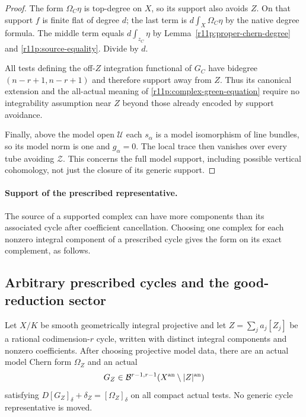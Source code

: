 \begin{proof}
The form $\Omega_C\eta$ is top-degree on $X$, so its support also
avoids $Z$.  On that support $f$ is finite flat of degree $d$;
the last term is $d\int_X\Omega_C\eta$ by the native degree formula.
The middle term equals $d\int_{z_C}\eta$ by
Lemma~\ref{r11p:proper-chern-degree} and
\eqref{r11p:source-equality}.  Divide by $d$.

All tests defining the off-$Z$ integration functional of $G_C$
have bidegree $(n-r+1,n-r+1)$ and therefore support away from $Z$.
Thus its canonical extension and the all-actual meaning of
\eqref{r11p:complex-green-equation} require no integrability
assumption near $Z$ beyond those already encoded by support avoidance.

Finally, above the model open $\mathcal U$ each $s_\alpha$ is a model
isomorphism of line bundles, so its model norm is one and $g_\alpha=0$.
The local trace then vanishes over every tube avoiding $\mathcal Z$.
This concerns the full model support, including possible vertical
cohomology, not just the closure of its generic support.
\end{proof}

\paragraph{Support of the prescribed representative.}
The source of a supported complex can have more components than its
associated cycle after coefficient cancellation.  Choosing one complex
for each nonzero integral component of a prescribed cycle gives the
form on its exact complement, as follows.

\subsection{Arbitrary prescribed cycles and the good-reduction sector}

\begin{corollary}
\label{r11p:any-cycle-pair}
Let $X/K$ be smooth geometrically integral projective and let
$Z=\sum_j a_j[Z_j]$ be a rational codimension-$r$ cycle, written with
distinct integral components and nonzero coefficients.  After choosing
projective model data, there are an actual model Chern form $\Omega_Z$
and an actual
\[
                  G_Z\in\mathcal B^{r-1,r-1}
                           (X^{\rm an}\setminus|Z|^{\rm an})
\]
satisfying $D[G_Z]_\delta+\delta_Z=[\Omega_Z]_\delta$ on all compact
actual tests.  No generic cycle representative is moved.
\end{corollary}

